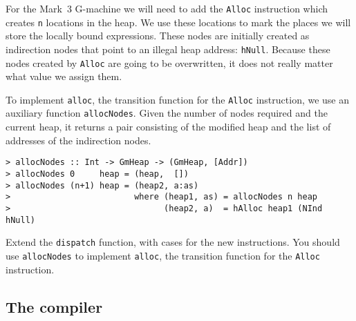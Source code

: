 For the Mark~3 G-machine we will need to add the \mbox{\tt Alloc} instruction
which creates \mbox{\tt n} locations in the heap. We use these locations to
mark the places we will store the locally bound expressions. These
nodes are initially created as indirection nodes that point to an
illegal heap address: \mbox{\tt hNull}. Because these nodes created by \mbox{\tt Alloc}
are going to be overwritten, it does not really matter what value we
assign them.

\gmrule%
{}%
{}

To implement \mbox{\tt alloc}, the transition function for the \mbox{\tt Alloc} instruction, we
use an auxiliary function \mbox{\tt allocNodes}. Given the number of nodes
required and the current heap, it returns a pair consisting of the
modified heap and the list of addresses of the indirection nodes.
\begin{verbatim}
> allocNodes :: Int -> GmHeap -> (GmHeap, [Addr])
> allocNodes 0     heap = (heap,  [])
> allocNodes (n+1) heap = (heap2, a:as)
>                         where (heap1, as) = allocNodes n heap
>                               (heap2, a)  = hAlloc heap1 (NInd hNull)
\end{verbatim}
%
%
%
\begin{exercise}\label{gm:X:step3}
Extend the \mbox{\tt dispatch} function, with cases for the new instructions.
You should use \mbox{\tt allocNodes} to implement \mbox{\tt alloc}, the transition
function for the \mbox{\tt Alloc} instruction.
\end{exercise}

\subsection{The compiler}

